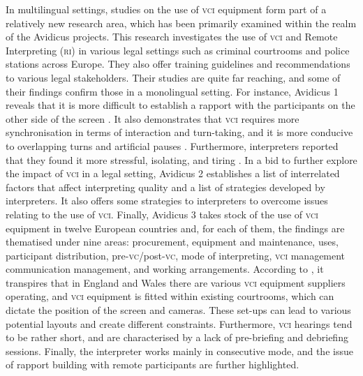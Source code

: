 \documentclass[output=paper]{langsci/langscibook}
\begin{document}
In multilingual settings, studies on the use of \textsc{vci} equipment form part of a relatively new research area, which has been primarily examined within the realm of the Avidicus projects. This research investigates the use of \textsc{vci} and Remote Interpreting (\textsc{ri}) in various legal settings such as criminal courtrooms and police stations across Europe. They also offer training guidelines and recommendations to various legal stakeholders. Their studies are quite far reaching, and some of their findings confirm those in a monolingual setting. For instance, Avidicus 1 reveals that it is more difficult to establish a rapport with the participants on the other side of the screen \citep{Rombouts2011}. It also demonstrates that \textsc{vci} requires more synchronisation in terms of interaction and turn-taking, and it is more conducive to overlapping turns and artificial pauses \citep{Balogh2011}. Furthermore, interpreters reported that they found it more stressful, isolating, and tiring \citep{Miler-Cassino2011}. In a bid to further explore the impact of \textsc{vci} in a legal setting, Avidicus 2 establishes a list of interrelated factors that affect interpreting quality and a list of strategies developed by interpreters. It also offers some strategies to interpreters to overcome issues relating to the use of \textsc{vci}. Finally, Avidicus 3 takes stock of the use of \textsc{vci} equipment in twelve European countries and, for each of them, the findings are thematised under nine areas: procurement, equipment and maintenance, uses, participant distribution, pre-\textsc{vc}/post-\textsc{vc}, mode of interpreting, \textsc{vci} management communication management, and working arrangements. According to \citet{Braun2016a}, it transpires that in England and Wales there are various \textsc{vci} equipment suppliers operating, and \textsc{vci} equipment is fitted within existing courtrooms, which can dictate the position of the screen and cameras. These set-ups can lead to various potential layouts and create different constraints. Furthermore, \textsc{vci} hearings tend to be rather short, and are characterised by a lack of pre-briefing and debriefing sessions. Finally, the interpreter works mainly in consecutive mode, and the issue of rapport building with remote participants are further highlighted. 
\end{document}
